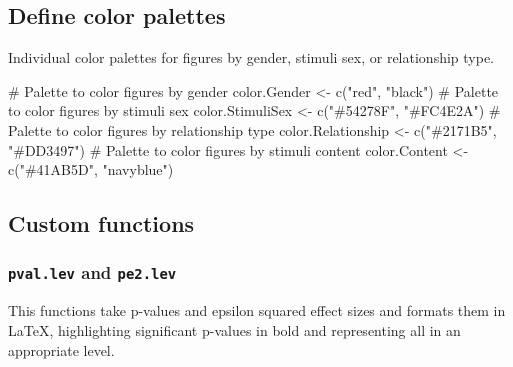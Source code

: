 \documentclass[
  bookmarksnumbered]{article}
\newenvironment{Shaded}{\begin{snugshade}}{\end{snugshade}}
\newcommand{\CommentTok}[1]{\textcolor[rgb]{0.50,0.62,0.50}{#1}}
\newcommand{\FunctionTok}[1]{\textcolor[rgb]{0.94,0.94,0.56}{#1}}
\newcommand{\NormalTok}[1]{\textcolor[rgb]{0.80,0.80,0.80}{#1}}
\newcommand{\OtherTok}[1]{\textcolor[rgb]{0.94,0.94,0.56}{#1}}
\newcommand{\StringTok}[1]{\textcolor[rgb]{0.80,0.58,0.58}{#1}}
\begin{document}
\subsection{Define color palettes}\label{define-color-palettes}

Individual color palettes for figures by gender, stimuli sex, or relationship type.

\begin{Shaded}
\begin{Highlighting}[]
\CommentTok{\# Palette to color figures by gender}
\NormalTok{color.Gender }\OtherTok{\textless{}{-}} \FunctionTok{c}\NormalTok{(}\StringTok{"red"}\NormalTok{, }\StringTok{"black"}\NormalTok{)}
\CommentTok{\# Palette to color figures by stimuli sex}
\NormalTok{color.StimuliSex }\OtherTok{\textless{}{-}} \FunctionTok{c}\NormalTok{(}\StringTok{"\#54278F"}\NormalTok{, }\StringTok{"\#FC4E2A"}\NormalTok{)}
\CommentTok{\# Palette to color figures by relationship type}
\NormalTok{color.Relationship }\OtherTok{\textless{}{-}} \FunctionTok{c}\NormalTok{(}\StringTok{"\#2171B5"}\NormalTok{, }\StringTok{"\#DD3497"}\NormalTok{)}
\CommentTok{\# Palette to color figures by stimuli content}
\NormalTok{color.Content }\OtherTok{\textless{}{-}} \FunctionTok{c}\NormalTok{(}\StringTok{"\#41AB5D"}\NormalTok{, }\StringTok{"navyblue"}\NormalTok{)}
\end{Highlighting}
\end{Shaded}

\subsection{Custom functions}\label{custom-functions}

\subsubsection{\texorpdfstring{\texttt{pval.lev} and \texttt{pe2.lev}}{pval.lev and pe2.lev}}\label{pval.lev-and-pe2.lev}

This functions take p-values and epsilon squared effect sizes and formats them in \LaTeX, highlighting significant p-values in bold and representing all in an appropriate level.
\end{document}
